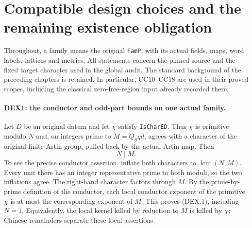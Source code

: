 \section{Compatible design choices and the remaining existence obligation}
\label{sec:design-existence-v031}


Throughout, a family means the original \texttt{FamP}, with its actual
fields, maps, word labels, lattices and metrics. All statements concern the
pinned source and the fixed target character used in the global audit.
The standard background of the preceding chapters is retained. In
particular, CC10--CC18 are used in their proved scopes, including the
classical zero-free-region input already recorded there.

\paragraph{DEX1: the conductor and odd-part bounds on one actual family.}
\label{claim:DEX1}
Let $D$ be an original datum and let $\chi$ satisfy
\texttt{IsCharED}. Thus $\chi$ is primitive modulo $N$ and, on
integers prime to $M=Q_Sqd$, agrees with a character of the original
finite Artin group, pulled back by the actual Artin map. Then
\[
                         N\mid M.                         \tag{DEX.1}
\]
To see the precise conductor assertion, inflate both characters to
$\operatorname{lcm}(N,M)$. Every unit there has an integer representative
prime to both moduli, so the two inflations agree. The right-hand
character factors through $M$. By the prime-by-prime definition of the
conductor, each local conductor exponent of the primitive $\chi$ is at
most the corresponding exponent of $M$. This proves (DEX.1), including
$N=1$. Equivalently, the local kernel killed by reduction to $M$ is
killed by $\chi$; Chinese remainders separate these local assertions.

